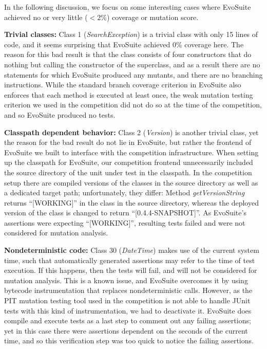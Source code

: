 \documentclass[runningheads,a4paper]{llncs}
\newcommand{\EVOSUITE}{{\sc EvoSuite}\xspace}
\begin{document}
In the following discussion, we
focus on some interesting cases where \EVOSUITE achieved no or very
little ($<2\%$) coverage or mutation score.

{\bf Trivial classes: } Class 1 ({\it SearchException}) is a trivial
class with only 15 lines of code, and it seems surprising that
\EVOSUITE achieved 0\% coverage here. The reason for this bad result
is that the class consists of four constructors that do nothing but
calling the constructor of the superclass, and as a result there are
no statements for which \EVOSUITE produced any mutants, and there are
no branching instructions. While the standard branch coverage
criterion in \EVOSUITE also enforces that each method is executed at
least once, the weak mutation testing criterion we used in the
competition did not do so at the time of the competition, and so
\EVOSUITE produced no tests.

{\bf Classpath dependent behavior: } Class 2 ({\it Version}) is
another trivial class, yet the reason for the bad result do not lie in
\EVOSUITE, but rather the frontend of \EVOSUITE we built to interface
with the competition infrastructure. When setting up the classpath for
\EVOSUITE, our competition frontend unnecessarily included the source
directory of the unit under test in the classpath. In the competition
setup there are compiled versions of the classes in the source
directory as well as a dedicated target path; unfortunately, they
differ: Method {\it getVersionString} returns ``[WORKING]'' in the
class in the source directory, whereas the deployed version of the
class is changed to return ``[0.4.4-SNAPSHOT]''. As \EVOSUITE's
assertions were expecting ``[WORKING]'', resulting tests failed and
were not considered for mutation analysis.

{\bf Nondeterministic code: } Class 30 ({\it DateTime}) makes use of
the current system time, such that automatically generated assertions
may refer to the time of test execution. If this happens, then the
tests will fail, and will not be considered for mutation
analysis. This is a known issue, and \EVOSUITE overcomes it by using
bytecode instrumentation that replaces nondeterministic
calls. However, as the PIT mutation testing tool used in the
competition is not able to handle JUnit tests with this kind of
instrumentation, we had to deactivate it. \EVOSUITE does compile and
execute tests as a last step to comment out any failing assertions;
yet in this case there were assertions dependent on the seconds of the
current time, and so this verification step was too quick to notice
the failing assertions.
\end{document}
